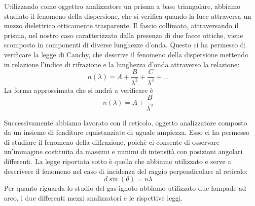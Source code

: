 Utilizzando come oggettro analizzatore un prisma a base triangolare, abbiamo studiato il fenomeno della dispersione, che si verifica quando la luce attraversa un mezzo dielettrico otticamente trasparente. Il fascio collimato, attraversando il prisma, nel nostro caso caratterizzato dalla presenza di due facce ottiche, viene scomposto in componenti di diverse lunghezze d'onda. Questo ci ha permesso di verificare la legge di Cauchy, che descrive il fenomeno della dispersione mettendo in relazione l'indice di rifrazione e la lunghezza d'onda attraverso la relazione:
\begin{equation}
n(\lambda)=A+\dfrac{B}{\lambda ^2}+\dfrac{C}{\lambda ^4} + ...
\end{equation}
La forma approssimata che si andrà a verificare è
$$
n(\lambda)=A+\dfrac{B}{\lambda ^2}
$$

Successivamente abbiamo lavorato con il reticolo, oggetto analizzatore composto da un insieme di fenditure equistanziate di uguale ampiezza. Esso ci ha permesso di studiare il fenomeno della diffrazione, poichè ci consente di osservare un'immagine costituita da massimi e minimi di intensità con posizioni angolari differenti. La legge riportata sotto è quella che abbiamo utilizzato e serve a descrivere il fenomeno nel caso di incidenza del raggio perpendicolare al reticolo:
\begin{equation}
    d\sin(\theta) = n\lambda
\label{rifrazione}
\end{equation}
Per quanto riguarda lo studio del gas ignoto abbiamo utilizzato due lampade ad arco, i due differenti mezzi analizzatori e le rispettive leggi.
